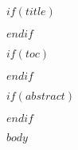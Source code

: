 \documentclass[12pt]{article} %
\makeatletter
\def\myaffiliation{University of Chicago}
\def\myauthor{Mendel Kranz}
\def\myemail{\small{\texttt{\href{mailto:mkranz@uchicago.edu}{mkranz@uchicago.edu}}}}
\makeatother
\begin{document}
\author {\myauthor \\ \emph{\myaffiliation} \\ \myemail  \date{\today}}

$if(title)$
\maketitle
$endif$



$if(toc)$
{
\hypersetup{linkcolor=black}
\setcounter{tocdepth}{4}
\tableofcontents
}
\newpage %

$endif$


$if(abstract)$
\begin{abstract}
\noindent $abstract$
\end{abstract}
$endif$


$body$

\end{document}
